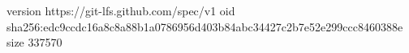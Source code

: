 version https://git-lfs.github.com/spec/v1
oid sha256:edc9ccdc16a8c8a88b1a0786956d403b84abc34427c2b7e52e299ccc8460388e
size 337570
